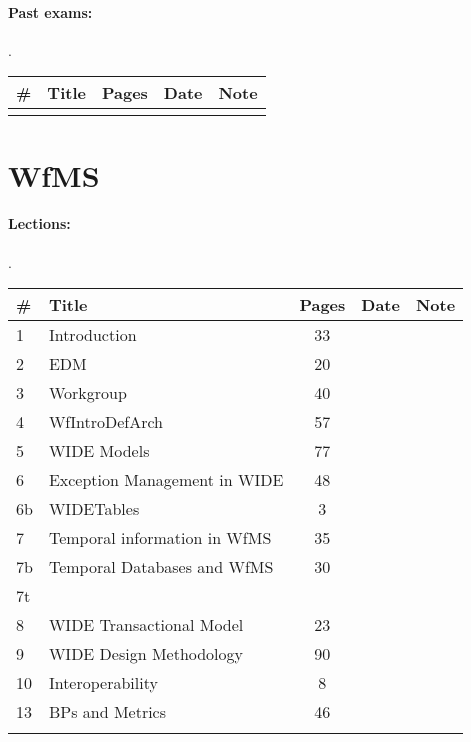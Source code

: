 \documentclass[a4paper,12pt]{article} %
\begin{document}
\paragraph{Past exams:}.\\
\begin{tabularx}{\textwidth}{|l|X|c|l|c|}
	\hline
	\# & Title & Pages & Date & Note \\
	\hline
	&  &  &  &  \\
	\hline
\end{tabularx}

\newpage
\section{WfMS}
\paragraph{Lections:}.\\
\begin{tabularx}{\textwidth}{|l|X|c|l|c|}
	\hline
	\# & Title & Pages & Date & Note \\
	\hline
	1 & Introduction & 33 &  &  \\
	\hline
	2 & EDM & 20 &  &  \\
	\hline
	3 & Workgroup & 40 &  &  \\
	\hline
	4 & WfIntroDefArch & 57 &  &  \\
	\hline
	5 & WIDE Models & 77 &  &  \\
	\hline
	6 & Exception Management in WIDE & 48 &  &  \\
	\hline
	6b & WIDETables & 3 &  &  \\
	\hline
	7 & Temporal information in WfMS & 35 &  &  \\
	\hline
	7b & Temporal Databases and WfMS & 30 &  &  \\
	\hline
	7t &  &  &  &  \\
	\hline
	8 & WIDE Transactional Model & 23 &  &  \\
	\hline
	9 & WIDE Design Methodology & 90 &  &  \\
	\hline
	10 & Interoperability & 8 &  &  \\
	\hline
	13 & BPs and Metrics & 46 &  &  \\
	\hline
	&  &  &  &  \\
	\hline
\end{tabularx}
\end{document}
